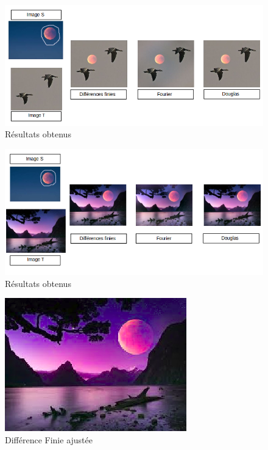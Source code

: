 \begin{figure}[!htb]
\centering
\includegraphics[scale=0.6]{Images/Resultats/1.png}
\caption{Résultats obtenus}
\end{figure}

\begin{figure}[!htb]
\centering
\includegraphics[scale=0.6]{Images/Resultats/2.png}
\caption{Résultats obtenus}
\end{figure}

\begin{figure}[!htb]
\centering
\includegraphics[scale=0.5]{Images/Resultats/LuneDFChangeSel.png}
\caption{Différence Finie ajustée}
\end{figure}


